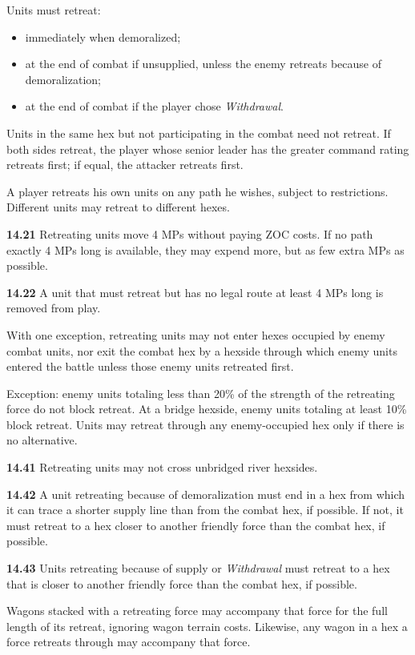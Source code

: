 

Units must retreat:
\begin{itemize}
\item immediately when demoralized;
\item at the end of combat if unsupplied, unless the enemy retreats because of demoralization;
\item at the end of combat if the player chose \textit{Withdrawal}.
\end{itemize}

Units in the same hex but not participating in the combat need not retreat. If both sides retreat, the player whose senior leader has the greater command rating retreats first; if equal, the attacker retreats first.


A player retreats his own units on any path he wishes, subject to restrictions. Different units may retreat to different hexes.

\textbf{14.21} Retreating units move 4 MPs without paying ZOC costs. If no path exactly 4 MPs long is available, they may expend more, but as few extra MPs as possible.

\textbf{14.22} A unit that must retreat but has no legal route at least 4 MPs long is removed from play.


With one exception, retreating units may not enter hexes occupied by enemy combat units, nor exit the combat hex by a hexside through which enemy units entered the battle unless those enemy units retreated first.

Exception: enemy units totaling less than 20\% of the strength of the retreating force do not block retreat. At a bridge hexside, enemy units totaling at least 10\% block retreat. Units may retreat through any enemy-occupied hex only if there is no alternative.


\textbf{14.41} Retreating units may not cross unbridged river hexsides.

\textbf{14.42} A unit retreating because of demoralization must end in a hex from which it can trace a shorter supply line than from the combat hex, if possible. If not, it must retreat to a hex closer to another friendly force than the combat hex, if possible.

\textbf{14.43} Units retreating because of supply or \textit{Withdrawal} must retreat to a hex that is closer to another friendly force than the combat hex, if possible.


Wagons stacked with a retreating force may accompany that force for the full length of its retreat, ignoring wagon terrain costs. Likewise, any wagon in a hex a force retreats through may accompany that force.
